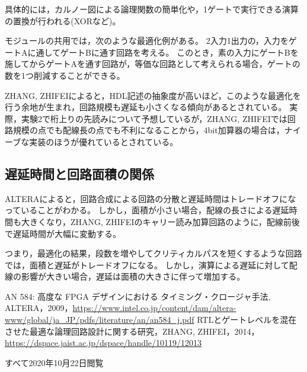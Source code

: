 \documentclass[a4paper,15pt]{jsarticle}
\begin{document}
具体的には，カルノー図による論理関数の簡単化や，1ゲートで実行できる演算の置換が行われる(XORなど)。

モジュールの共用では，次のような最適化例がある。
2入力1出力の，入力をゲートAに通してゲートBに通す回路を考える。
このとき，素の入力にゲートBを施してからゲートAを通す回路が，等価な回路として考えられる場合，ゲートの数を1つ削減することができる。

ZHANG, ZHIFEI\cite{RTL}によると，HDL記述の抽象度が高いほど，このような最適化を行う余地が生まれ，回路規模も遅延も小さくなる傾向があるとされている。
実際，実験2で桁上りの先読みについて予想しているが，ZHANG, ZHIFEI\cite{RTL}では回路規模の点でも配線長の点でも不利になることから，4bit加算器の場合は，ナイーブな実装のほうが優れているとされている。

\subsection{遅延時間と回路面積の関係}
ALTERA\cite{ALTERA}によると，回路合成による回路の分散と遅延時間はトレードオフになっていることがわかる。
しかし，面積が小さい場合，配線の長さによる遅延時間も大きくなり，ZHANG, ZHIFEI\cite{RTL}のキャリー読み加算回路のように，配線前後で遅延時間が大幅に変動する。

つまり，最適化の結果，段数を増やしてクリティカルパスを短くするような回路では，面積と遅延がトレードオフになる。
しかし，演算による遅延に対して配線の影響が大きい場合，遅延は面積の大きさに伴って増加する。

\begin{thebibliography}{99}
  AN 584: 高度な FPGA デザインにおける  タイミング・クロージャ手法, ALTERA，2009，\url{https://www.intel.co.jp/content/dam/altera-www/global/ja_JP/pdfs/literature/an/an584_j.pdf}
   RTLとゲートレベルを混在させた最適な論理回路設計に関する研究，ZHANG, ZHIFEI，2014，\url{https://dspace.jaist.ac.jp/dspace/handle/10119/12013}
\end{thebibliography}
すべて2020年10月22日閲覧
\end{document}
